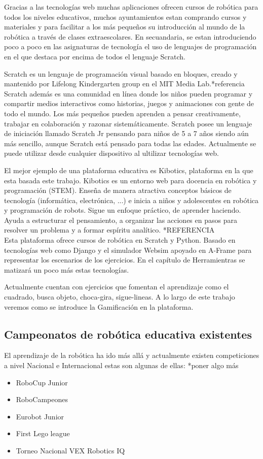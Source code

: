 Gracias a las tecnologías web muchas aplicaciones ofrecen cursos de robótica para todos los niveles educativos, muchos ayuntamientos estan comprando cursos y materiales y para facilitar a los más pequeños su introducción al mundo de la robótica a través de clases extraescolares. En secuandaria, se estan introduciendo poco a poco en las asignaturas de tecnología el uso de lenguajes de programación en el que destaca por encima de todos el lenguaje Scratch.

Scratch es un lenguaje de programación visual basado en bloques, creado y  mantenido por Lifelong Kindergarten group en el MIT Media Lab.*referencia Scratch además es una comunidad en línea donde los niños pueden programar y compartir medios interactivos como historias, juegos y animaciones con gente de todo el mundo. Los más pequeños pueden aprenden a pensar creativamente, trabajar en colaboración y razonar sistemáticamente. Scratch posee un lenguaje de iniciación llamado Scratch Jr pensando para niños de 5 a 7 años siendo aún más sencillo, aunque Scratch está pensado para todas las edades. Actualmente se puede utilizar desde cualquier dispositivo al ultilizar tecnologías web.


El mejor ejemplo de una plataforma educativa es Kibotics, plataforma en la que esta basada este trabajo. 
Kibotics es un entorno web para docencia en robótica y programación (STEM). Enseña de manera atractiva conceptos básicos de tecnología (informática, electrónica, ...) e inicia a niños y adolescentes en robótica y programación de robots. Sigue un enfoque práctico, de aprender haciendo. Ayuda a estructurar el pensamiento, a organizar las acciones en pasos para resolver un problema y a formar espíritu analítico. *REFERENCIA
\\
Esta plataforma ofrece cursos de robótica en Scratch y Python. Basado en tecnologías web como Django y el simulador Websim apoyado en  A-Frame para representar los escenarios de los ejercicios. En el capítulo de Herramientras se matizará un poco más estas tecnologías. 

Actualmente cuentan con ejercicios que fomentan el aprendizaje como el cuadrado, busca objeto, choca-gira, sigue-lineas. A lo largo de este trabajo veremos como se introduce la Gamificación en la plataforma.


\subsection{Campeonatos de robótica educativa existentes}

El aprendizaje de la robótica ha ido más allá y actualmente existen competiciones a nivel Nacional e Internacional estas son algunas de ellas:
*poner algo más
\begin{itemize}
    \item RoboCup Junior
    \item RoboCampeones
    \item Eurobot Junior
    \item First Lego league
    \item Torneo Nacional VEX Robotics IQ
\end{itemize}

